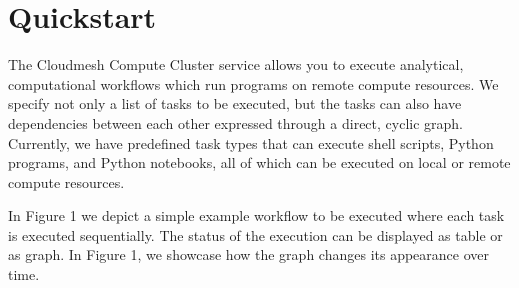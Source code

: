 \section{Quickstart}\label{quickstart}

The Cloudmesh Compute Cluster service allows you to execute analytical,
computational workflows which run programs on remote compute resources.
We specify not only a list of tasks to be executed, but the tasks can
also have dependencies between each other expressed through a direct,
cyclic graph. Currently, we have predefined task types that can execute
shell scripts, Python programs, and Python notebooks, all of which can
be executed on local or remote compute resources.

In Figure 1 we depict a simple example workflow to be executed where
each task is executed sequentially. The status of the execution can be
displayed as table or as graph. In Figure 1, we showcase how the graph
changes its appearance over time.

